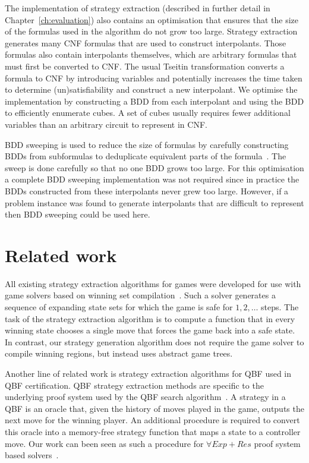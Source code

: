 The implementation of strategy extraction (described in further detail in Chapter~\ref{ch:evaluation}) also contains an optimisation that ensures that the size of the formulas used in the algorithm do not grow too large. Strategy extraction generates many CNF formulas that are used to construct interpolants. Those formulas also contain interpolants themselves, which are arbitrary formulas that must first be converted to CNF. The usual Tseitin transformation converts a formula to CNF by introducing variables and potentially increases the time taken to determine (un)satisfiability and construct a new interpolant.  We optimise the implementation by constructing a BDD from each interpolant and using the BDD to efficiently enumerate cubes. A set of cubes usually requires fewer additional variables than an arbitrary circuit to represent in CNF.

BDD sweeping is used to reduce the size of formulas by carefully constructing BDDs from subformulas to deduplicate equivalent parts of the formula~\cite{Kuehlmann97}. The sweep is done carefully so that no one BDD grows too large. For this optimisation a complete BDD sweeping implementation was not required since in practice the BDDs constructed from these interpolants never grew too large. However, if a problem instance was found to generate interpolants that are difficult to represent then BDD sweeping could be used here.

\section{Related work}

All existing strategy extraction algorithms for games were developed for use with game solvers based on winning set compilation~\cite{Bloem14}.  Such a solver generates a sequence of expanding state sets for which the game is safe for $1,2,\ldots$ steps.  The task of the strategy extraction algorithm is to compute a function that in every winning state chooses a single move that forces the game back into a safe state.  In contrast, our strategy generation algorithm does not require the game solver to compile winning regions, but instead uses abstract game trees.

Another line of related work is strategy extraction algorithms for QBF used in QBF certification. QBF strategy extraction methods are specific to the underlying proof system used by the QBF search algorithm~\cite{Lonsing10,Egly13,Goultiaeva11}.  A strategy in a QBF is an oracle that, given the history of moves played in the game, outputs the next move for the winning player.  An additional procedure is required to convert this oracle into a memory-free strategy function that maps a state to a controller move.  Our work can been seen as such a procedure for $\forall Exp+Res$ proof system based solvers~\cite{Janota13}.

